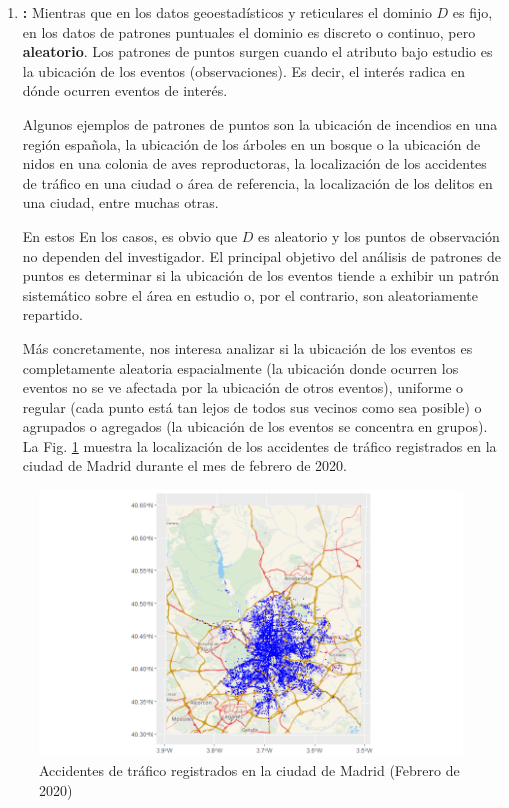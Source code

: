 \documentclass[
]{book}
\theoremstyle{definition}
\theoremstyle{definition}
\theoremstyle{definition}
\theoremstyle{definition}
\theoremstyle{remark}
\begin{document}
\begin{enumerate}
\def\labelenumi{\arabic{enumi}.}
\setcounter{enumi}{2}
\item
  \textbf{:} Mientras que en los datos geoestadísticos y
  reticulares el dominio \(D\) es fijo, en los datos de patrones puntuales el
  dominio es discreto o continuo, pero \textbf{aleatorio}. Los patrones de puntos
  surgen cuando el atributo bajo estudio es la ubicación de los eventos
  (observaciones). Es decir, el interés radica en dónde ocurren eventos de
  interés.

  Algunos ejemplos de patrones de puntos son la ubicación de incendios en una
  región española, la ubicación de los árboles en un bosque o la ubicación de
  nidos en una colonia de aves reproductoras, la localización de los
  accidentes de tráfico en una ciudad o área de referencia, la localización de
  los delitos en una ciudad, entre muchas otras.

  En estos En los casos, es obvio que \(D\) es aleatorio y los puntos de
  observación no dependen del investigador. El principal objetivo del análisis
  de patrones de puntos es determinar si la ubicación de los eventos tiende a
  exhibir un patrón sistemático sobre el área en estudio o, por el contrario,
  son aleatoriamente repartido.

  Más concretamente, nos interesa analizar si la ubicación de los eventos es
  completamente aleatoria espacialmente (la ubicación donde ocurren los
  eventos no se ve afectada por la ubicación de otros eventos), uniforme o
  regular (cada punto está tan lejos de todos sus vecinos como sea posible) o
  agrupados o agregados (la ubicación de los eventos se concentra en grupos).
  La Fig. \ref{fig:ejem-pp} muestra la localización de los accidentes de
  tráfico registrados en la ciudad de Madrid durante el mes de febrero
  de 2020.
\end{enumerate}

\begin{figure}

{\centering \includegraphics[width=0.6\linewidth]{img/traf_madrid_feb_2020} 

}

\caption{Accidentes de tráfico registrados en la ciudad de Madrid (Febrero de 2020)}\label{fig:ejem-pp}
\end{figure}
\end{document}
